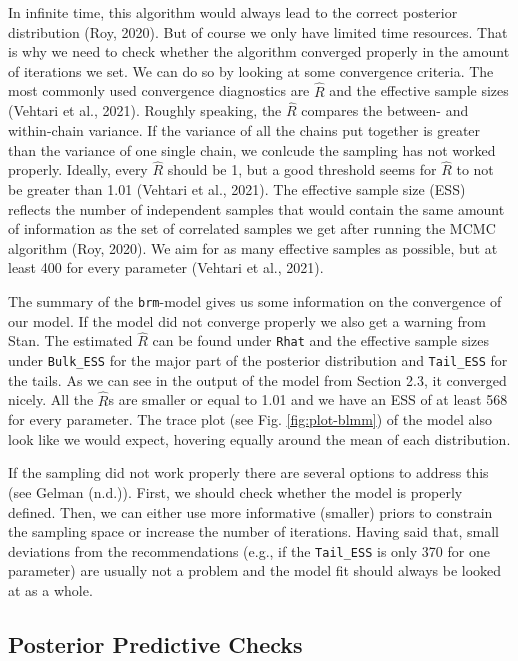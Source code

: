 \documentclass[
  doc,12pt,floatsintext]{apa7}
\begin{document}
In infinite time, this algorithm would always lead to the correct posterior distribution (Roy, 2020). But of course we only have limited time resources. That is why we need to check whether the algorithm converged properly in the amount of iterations we set. We can do so by looking at some convergence criteria. The most commonly used convergence diagnostics are \(\hat{R}\) and the effective sample sizes (Vehtari et al., 2021). Roughly speaking, the \(\hat{R}\) compares the between- and within-chain variance. If the variance of all the chains put together is greater than the variance of one single chain, we conlcude the sampling has not worked properly. Ideally, every \(\hat{R}\) should be 1, but a good threshold seems for \(\hat{R}\) to not be greater than 1.01 (Vehtari et al., 2021). The effective sample size (ESS) reflects the number of independent samples that would contain the same amount of information as the set of correlated samples we get after running the MCMC algorithm (Roy, 2020). We aim for as many effective samples as possible, but at least 400 for every parameter (Vehtari et al., 2021).

The summary of the \texttt{brm}-model gives us some information on the convergence of our model. If the model did not converge properly we also get a warning from Stan. The estimated \(\hat{R}\) can be found under \texttt{Rhat} and the effective sample sizes under \texttt{Bulk\_ESS} for the major part of the posterior distribution and \texttt{Tail\_ESS} for the tails. As we can see in the output of the model from Section 2.3, it converged nicely. All the \(\hat{R}\)s are smaller or equal to 1.01 and we have an ESS of at least 568 for every parameter. The trace plot (see Fig. \ref{fig:plot-blmm}) of the model also look like we would expect, hovering equally around the mean of each distribution.

If the sampling did not work properly there are several options to address this (see Gelman (n.d.)). First, we should check whether the model is properly defined. Then, we can either use more informative (smaller) priors to constrain the sampling space or increase the number of iterations. Having said that, small deviations from the recommendations (e.g., if the \texttt{Tail\_ESS} is only 370 for one parameter) are usually not a problem and the model fit should always be looked at as a whole.

\subsection{Posterior Predictive Checks}\label{posterior-predictive-checks}
\end{document}
